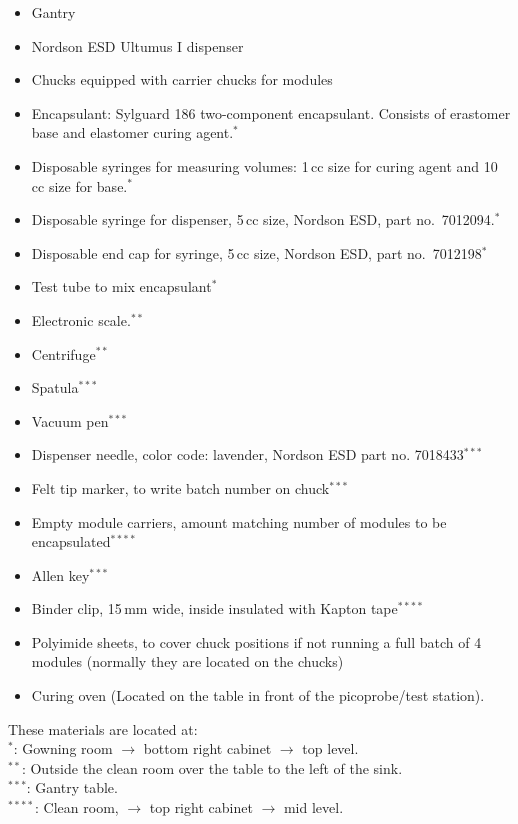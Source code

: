 \documentclass[12pt]{unlsilabsop}
\begin{document}
\begin{itemize}
    \item Gantry
    \item Nordson ESD Ultumus I dispenser
    \item Chucks equipped with carrier chucks for modules
    \item Encapsulant: Sylguard 186 two-component encapsulant. Consists of erastomer base and elastomer curing agent.$^*$
    \item Disposable syringes for measuring volumes: 1\,cc size for curing agent and 10\,cc size for base.$^*$ 
    \item Disposable syringe for dispenser, 5\,cc size, Nordson ESD, part no.~7012094.$^*$
    \item Disposable end cap for syringe, 5\,cc size, Nordson ESD, part no.~7012198$^*$
    \item Test tube to mix encapsulant$^*$
    \item Electronic scale.$^{**}$
    \item Centrifuge$^{**}$
    \item Spatula$^{***}$
    \item Vacuum pen$^{***}$
    \item Dispenser needle, color code: lavender, Nordson ESD part no. 7018433$^{***}$
    \item Felt tip marker, to write batch number on chuck$^{***}$
    \item Empty module carriers, amount matching number of modules to be encapsulated$^{****}$ 
    \item Allen key$^{***}$
    \item Binder clip, 15\,mm wide, inside insulated with Kapton tape$^{****}$ 
    \item Polyimide sheets, to cover chuck positions if not running a full batch of 4 modules (normally they are located on the chucks)
    \item Curing oven (Located  on the table in front of the picoprobe/test station).
\end{itemize}

These materials are located at: \\
$^*$: Gowning room $\to$ bottom right cabinet $\to$ top level.\\
$^{**}$: Outside the clean room over the table to the left of the sink.\\ 
$^{***}$: Gantry table. \\
$^{****}$: Clean room, $\to$ top right cabinet $\to$ mid level.\\  
\end{document}
